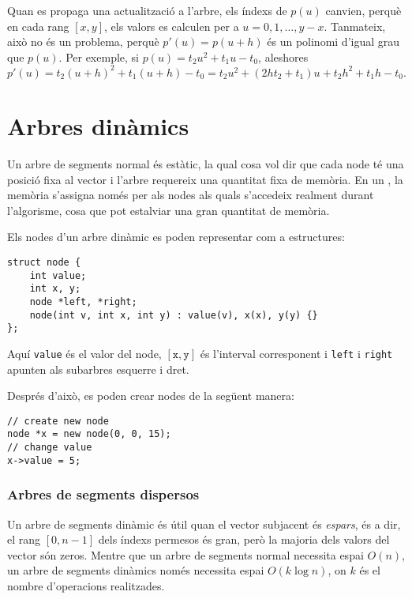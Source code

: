 Quan es propaga una actualització a l'arbre, els índexs de $p(u)$
canvien, perquè en cada rang $[x,y]$, els valors es calculen per a
$u=0,1,\ldots,y-x$. Tanmateix, això no és un problema, perquè
$p'(u)=p(u+h)$ és un polinomi d'igual grau que $p(u)$. Per exemple, si
$p(u)=t_2 u^2+t_1 u-t_0$, aleshores
\[p'(u)=t_2(u+h)^2+t_1(u+h)-t_0=t_2 u^2 + (2ht_2+t_1)u+t_2h^2+t_1h-t_0.\]


\section{Arbres dinàmics}


Un arbre de segments normal és estàtic, la qual cosa vol dir que cada
node té una posició fixa al vector i l'arbre requereix una quantitat
fixa de memòria. En un , la memòria
s'assigna només per als nodes als quals s'accedeix realment durant
l'algorisme, cosa que pot estalviar una gran quantitat de memòria.

Els nodes d'un arbre dinàmic es poden representar com a estructures:
\begin{lstlisting}
struct node {
    int value;
    int x, y;
    node *left, *right;
    node(int v, int x, int y) : value(v), x(x), y(y) {}
};
\end{lstlisting}
Aquí \texttt{value} és el valor del node, $[\texttt{x},\texttt{y}]$ és
l'interval corresponent i \texttt{left} i \texttt{right} apunten als
subarbres esquerre i dret.

Després d'això, es poden crear nodes de la següent manera:
\begin{lstlisting}
// create new node
node *x = new node(0, 0, 15);
// change value
x->value = 5;
\end{lstlisting}


\subsubsection{Arbres de segments dispersos}


Un arbre de segments dinàmic és útil quan el vector subjacent és
\emph{espars}, és a dir, el rang $[0,n-1]$ dels índexs permesos és
gran, però la majoria dels valors del vector són zeros. Mentre que un
arbre de segments normal necessita espai $O(n)$, un arbre de segments
dinàmics només necessita espai $O(k \log n)$, on $k$ és el nombre
d'operacions realitzades.

